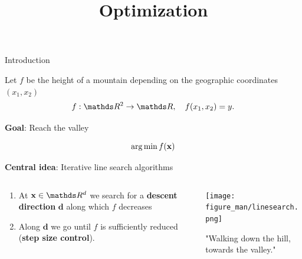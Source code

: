 








\newcommand{\learninggoals}{
\item LEARNING GOAL 1
\item LEARNING GOAL 2}



\title{Optimization}




\begin{vbframe}{Introduction}

	Let $f$ be the height of a mountain depending on the geographic coordinates $(x_1, x_2)$
	\vspace*{-0.1cm}
	$$
	f: \R^2 \to \R, \quad f(x_1, x_2) = y.
	$$
	
	\textbf{Goal}: Reach the valley

	$$
	\operatorname{arg\,min} f(\mathbf{x})
	$$
	
	\textbf{Central idea}: Iterative line search algorithms
	\vspace*{-0.15cm}
	\begin{columns}
		\begin{column}{0.58\textwidth}
			\begin{enumerate}
				\item At $\xv \in \R^d$ we search for a \textbf{descent direction} $\mathbf{d}$ along which $f$ decreases
			  	\item Along $\mathbf{d}$ we go until $f$ is sufficiently reduced (\textbf{step size control}).
			\end{enumerate}
		\end{column}
		\begin{column}{0.4\textwidth}
			\begin{center}
			\texttt{[image: figure\_man/linesearch.png]}
			\hspace{2cm} \begin{footnotesize} "Walking down the hill, towards the valley." \end{footnotesize}\\
			\end{center}
		\end{column}
	\end{columns}

\end{vbframe}

